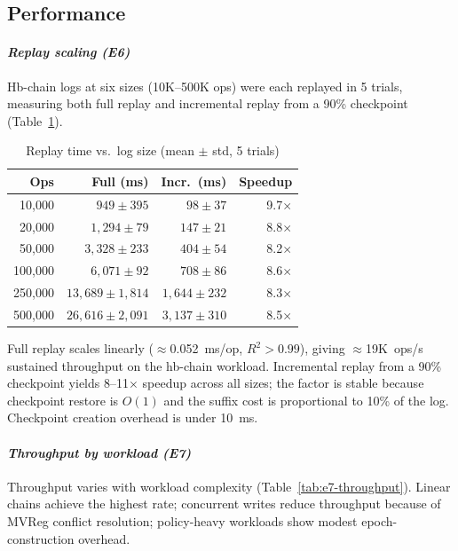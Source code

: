 \documentclass[10pt,journal,compsoc]{IEEEtran}
\begin{document}
\subsection{Performance}\label{subsec:performance}

\paragraph*{\textit{Replay scaling (E6)}}
Hb-chain logs at six sizes (10K--500K ops) were each replayed in 5 trials, measuring both full replay and incremental replay from a 90\% checkpoint (Table~\ref{tab:e6-replay}).

\begin{table}[!htbp]
\centering
\caption{Replay time vs.\ log size (mean $\pm$ std, 5 trials)}
\label{tab:e6-replay}
\begin{tabular}{@{}rrrr@{}}
\toprule
\textbf{Ops} & \textbf{Full (ms)} & \textbf{Incr.\ (ms)} & \textbf{Speedup} \\
\midrule
10,000  & $949 \pm 395$   & $98 \pm 37$     & 9.7$\times$ \\
20,000  & $1{,}294 \pm 79$  & $147 \pm 21$    & 8.8$\times$ \\
50,000  & $3{,}328 \pm 233$ & $404 \pm 54$    & 8.2$\times$ \\
100,000 & $6{,}071 \pm 92$  & $708 \pm 86$    & 8.6$\times$ \\
250,000 & $13{,}689 \pm 1{,}814$ & $1{,}644 \pm 232$ & 8.3$\times$ \\
500,000 & $26{,}616 \pm 2{,}091$ & $3{,}137 \pm 310$ & 8.5$\times$ \\
\bottomrule
\end{tabular}
\end{table}

Full replay scales linearly ($\approx$0.052~ms/op, $R^2>0.99$), giving $\approx$19K~ops/s sustained throughput on the hb-chain workload. Incremental replay from a 90\% checkpoint yields 8--11$\times$ speedup across all sizes; the factor is stable because checkpoint restore is $O(1)$ and the suffix cost is proportional to 10\% of the log. Checkpoint creation overhead is under 10~ms.

\paragraph*{\textit{Throughput by workload (E7)}}
Throughput varies with workload complexity (Table~\ref{tab:e7-throughput}). Linear chains achieve the highest rate; concurrent writes reduce throughput because of MVReg conflict resolution; policy-heavy workloads show modest epoch-construction overhead.
\end{document}
